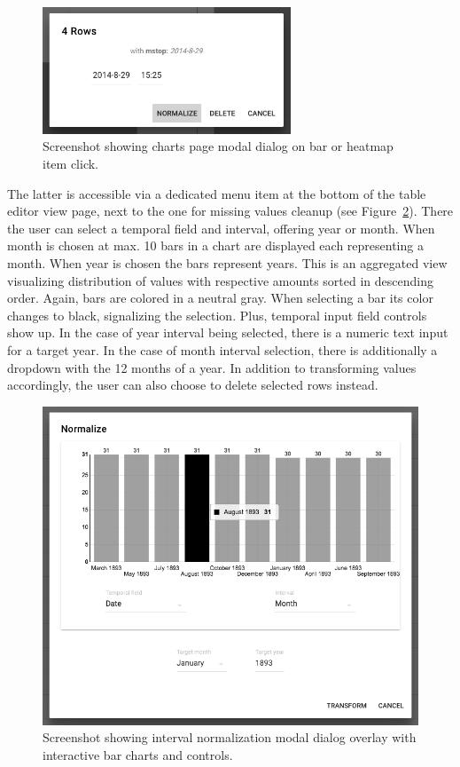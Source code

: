 \begin{figure}[h]
  \centering
  \includegraphics[width=0.66\textwidth]{figures/implementation/screenshot-charts-dialog}
  \caption{Screenshot showing charts page modal dialog on bar or heatmap item click.}
  \label{fig:screenshot-charts-dialog}
\end{figure}

The latter is accessible via a dedicated menu item at the bottom of the table editor view page, next to the one for missing values cleanup (see Figure~\ref{fig:screenshot-normalization}).
There the user can select a temporal field and interval, offering year or month.
When month is chosen at max. 10 bars in a chart are displayed each representing a month.
When year is chosen the bars represent years.
This is an aggregated view visualizing distribution of values with respective amounts sorted in descending order.
Again, bars are colored in a neutral gray. When selecting a bar its color changes to black, signalizing the selection. Plus, temporal input field controls show up. In the case of year interval being selected, there is a numeric text input for a target year.
In the case of month interval selection, there is additionally a dropdown with the 12 months of a year.
In addition to transforming values accordingly, the user can also choose to delete selected rows instead.

\begin{figure}[h]
  \centering
  \includegraphics[width=1.0\textwidth]{figures/implementation/screenshot-normalization}
  \caption{Screenshot showing interval normalization modal dialog overlay with interactive bar charts and controls.}
  \label{fig:screenshot-normalization}
\end{figure}

